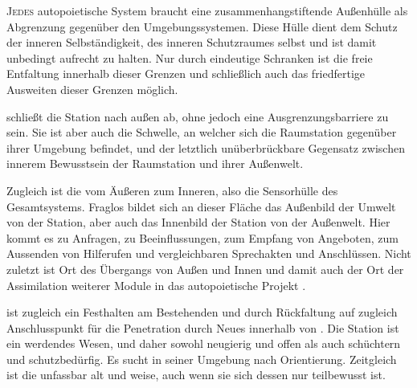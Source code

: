     \begin{newstuff}
        \lettrine{J}{edes} autopoietische System braucht eine zusammenhangstiftende Außenhülle als  Abgrenzung gegenüber den Umgebungssystemen. Diese Hülle dient dem Schutz der inneren Selbständigkeit, des inneren Schutzraumes selbst und ist damit unbedingt aufrecht zu halten. Nur durch eindeutige Schranken ist die freie Entfaltung innerhalb dieser Grenzen und schließlich auch das friedfertige Ausweiten dieser Grenzen möglich.


         schließt die Station nach außen ab, ohne jedoch eine Ausgrenzungsbarriere zu sein. Sie ist aber auch die Schwelle, an welcher sich die Raumstation gegenüber ihrer Umgebung befindet, und der letztlich unüberbrückbare Gegensatz zwischen innerem Bewusstsein der Raumstation und ihrer Außenwelt. {\color{white}}
        
        Zugleich ist  die  vom Äußeren zum Inneren, also die Sensorhülle des Gesamtsystems. Fraglos bildet sich an dieser Fläche das Außenbild der Umwelt von der Station, aber auch das Innenbild der Station von der Außenwelt. Hier kommt es zu Anfragen, zu Beeinflussungen, zum Empfang von Angeboten, zum Aussenden von Hilferufen und vergleichbaren Sprechakten und Anschlüssen. Nicht zuletzt ist  Ort des Übergangs von Außen und Innen und damit auch der Ort der Assimilation weiterer Module in das autopoietische Projekt .
        
         ist zugleich ein Festhalten am Bestehenden und durch Rückfaltung auf  zugleich Anschlusspunkt für die Penetration durch Neues innerhalb von . Die Station ist ein werdendes Wesen, und daher sowohl neugierig und offen als auch schüchtern und schutzbedürfig. Es sucht in seiner Umgebung nach Orientierung. Zeitgleich ist die  unfassbar alt und weise, auch wenn sie sich dessen nur teilbewusst ist.
        

\end{newstuff}

